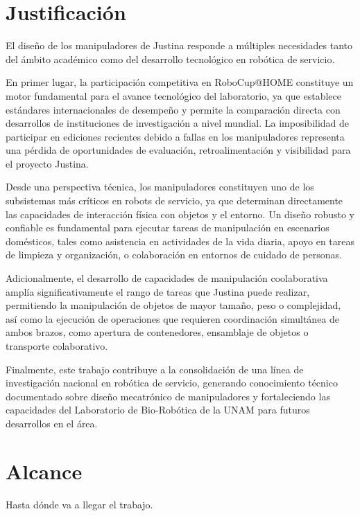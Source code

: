 \section{Justificaci\'on}

El diseño de los manipuladores de Justina responde a múltiples necesidades tanto del ámbito académico como del desarrollo tecnológico en robótica de servicio.

En primer lugar, la participación competitiva en RoboCup@HOME constituye un motor fundamental para el avance tecnológico del laboratorio, ya que establece estándares internacionales de desempeño y permite la comparación directa con desarrollos de instituciones de investigación a nivel mundial. La imposibilidad de participar en ediciones recientes debido a fallas en los manipuladores representa una pérdida de oportunidades de evaluación, retroalimentación y visibilidad para el proyecto Justina.

Desde una perspectiva técnica, los manipuladores constituyen uno de los subsistemas más críticos en robots de servicio, ya que determinan directamente las capacidades de interacción física con objetos y el entorno. Un diseño robusto y confiable es fundamental para ejecutar tareas de manipulación en escenarios domésticos, tales como asistencia en actividades de la vida diaria, apoyo en tareas de limpieza y organización, o colaboración en entornos de cuidado de personas.

Adicionalmente, el desarrollo de capacidades de manipulación coolaborativa amplía significativamente el rango de tareas que Justina puede realizar, permitiendo la manipulación de objetos de mayor tamaño, peso o complejidad, así como la ejecución de operaciones que requieren coordinación simultánea de ambos brazos, como apertura de contenedores, ensamblaje de objetos o transporte colaborativo.

Finalmente, este trabajo contribuye a la consolidación de una línea de investigación nacional en robótica de servicio, generando conocimiento técnico documentado sobre diseño mecatrónico de manipuladores y fortaleciendo las capacidades del Laboratorio de Bio-Robótica de la UNAM para futuros desarrollos en el área.

\section{Alcance}

Hasta dónde va a llegar el trabajo.